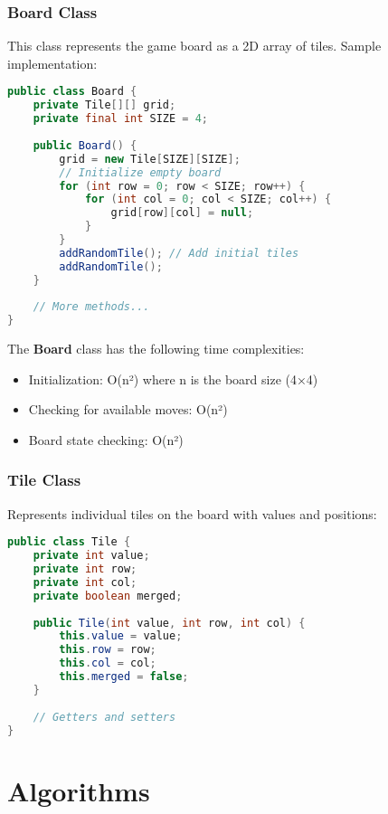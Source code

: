 \documentclass[12pt, a4paper]{article}
\begin{document}
\subsubsection{Board Class}
This class represents the game board as a 2D array of tiles. Sample implementation:

\begin{lstlisting}[language=Java, caption=Board Class Implementation]
public class Board {
    private Tile[][] grid;
    private final int SIZE = 4;
    
    public Board() {
        grid = new Tile[SIZE][SIZE];
        // Initialize empty board
        for (int row = 0; row < SIZE; row++) {
            for (int col = 0; col < SIZE; col++) {
                grid[row][col] = null;
            }
        }
        addRandomTile(); // Add initial tiles
        addRandomTile();
    }
    
    // More methods...
}
\end{lstlisting}

The \textbf{Board} class has the following time complexities:
\begin{itemize}
    \item Initialization: O(n²) where n is the board size (4×4)
    \item Checking for available moves: O(n²)
    \item Board state checking: O(n²)
\end{itemize}

\subsubsection{Tile Class}
Represents individual tiles on the board with values and positions:

\begin{lstlisting}[language=Java, caption=Tile Class Implementation]
public class Tile {
    private int value;
    private int row;
    private int col;
    private boolean merged;
    
    public Tile(int value, int row, int col) {
        this.value = value;
        this.row = row;
        this.col = col;
        this.merged = false;
    }
    
    // Getters and setters
}
\end{lstlisting}

\section{Algorithms}
\end{document}
